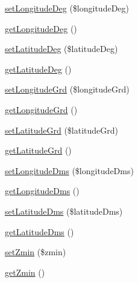 \begin{DoxyCompactItemize}
\item 
\hyperlink{class_acme_group_1_1_labo_bundle_1_1_entity_1_1villes_france_ac42d32dcd2c28094acdf949ccae57248}{set\+Longitude\+Deg} (\$longitude\+Deg)
\item 
\hyperlink{class_acme_group_1_1_labo_bundle_1_1_entity_1_1villes_france_ae1a9e83b2951e9968b02d923336fb007}{get\+Longitude\+Deg} ()
\item 
\hyperlink{class_acme_group_1_1_labo_bundle_1_1_entity_1_1villes_france_a456617d5260b679f7f2e9860770419e8}{set\+Latitude\+Deg} (\$latitude\+Deg)
\item 
\hyperlink{class_acme_group_1_1_labo_bundle_1_1_entity_1_1villes_france_a4cc6b51163ca621aeb82186de06572bb}{get\+Latitude\+Deg} ()
\item 
\hyperlink{class_acme_group_1_1_labo_bundle_1_1_entity_1_1villes_france_a630f66e9975090b9f91c1315187d7381}{set\+Longitude\+Grd} (\$longitude\+Grd)
\item 
\hyperlink{class_acme_group_1_1_labo_bundle_1_1_entity_1_1villes_france_a2ad05c8fd6edac29de8a35559e19ca83}{get\+Longitude\+Grd} ()
\item 
\hyperlink{class_acme_group_1_1_labo_bundle_1_1_entity_1_1villes_france_a0f853fb16b3a617107b6d6bf28823014}{set\+Latitude\+Grd} (\$latitude\+Grd)
\item 
\hyperlink{class_acme_group_1_1_labo_bundle_1_1_entity_1_1villes_france_a8c5cca44802d9cf370b26ae9af6eb540}{get\+Latitude\+Grd} ()
\item 
\hyperlink{class_acme_group_1_1_labo_bundle_1_1_entity_1_1villes_france_ab859332bf47540bfaaf2335e03da8ada}{set\+Longitude\+Dms} (\$longitude\+Dms)
\item 
\hyperlink{class_acme_group_1_1_labo_bundle_1_1_entity_1_1villes_france_afe826f62e6ffa21ebb95889ae6341bb4}{get\+Longitude\+Dms} ()
\item 
\hyperlink{class_acme_group_1_1_labo_bundle_1_1_entity_1_1villes_france_a239ea2de4f092f45d0d3ad84e28be7b7}{set\+Latitude\+Dms} (\$latitude\+Dms)
\item 
\hyperlink{class_acme_group_1_1_labo_bundle_1_1_entity_1_1villes_france_a610d3d92b696c987f7b194d84f2c6f9d}{get\+Latitude\+Dms} ()
\item 
\hyperlink{class_acme_group_1_1_labo_bundle_1_1_entity_1_1villes_france_a2dc730485f86e88a090e3fa748997a03}{set\+Zmin} (\$zmin)
\item 
\hyperlink{class_acme_group_1_1_labo_bundle_1_1_entity_1_1villes_france_a22ef25779cfbb305c55df218310a1fd2}{get\+Zmin} ()
\item 

\end{DoxyCompactItemize}
